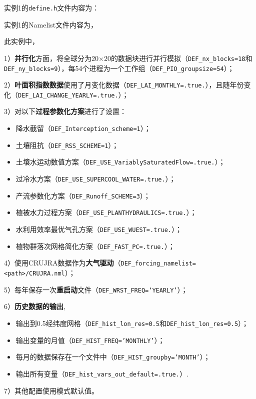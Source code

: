 实例1的\texttt{define.h}文件内容为：


实例1的Namelist文件内容为，


此实例中，\par
1）\textbf{并行化}方面，将全球分为20\textdegree$\times$20\textdegree 的数据块进行并行模拟（\texttt{DEF\_nx\_blocks=18}和\texttt{DEF\_ny\_blocks=9}），每54个进程为一个工作组（\texttt{DEF\_PIO\_groupsize=54}）；\par
2）\textbf{叶面积指数数据}使用了月变化数据（\texttt{DEF\_LAI\_MONTHLY=.true.}），且随年份变化（\texttt{DEF\_LAI\_CHANGE\_YEARLY=.true.}）；\par

3）对以下\textbf{过程参数化方案}进行了设置：
\begin{itemize}[nosep,leftmargin=4em]
    \item 降水截留（\texttt{DEF\_Interception\_scheme=1}）；
    \item 土壤阻抗（\texttt{DEF\_RSS\_SCHEME=1}）；
    \item 土壤水运动数值方案（\texttt{DEF\_USE\_VariablySaturatedFlow=.true.}）；
    \item 过冷水方案（\texttt{DEF\_USE\_SUPERCOOL\_WATER=.true.}）；
    \item 产流参数化方案（\texttt{DEF\_Runoff\_SCHEME=3}）；
    \item 植被水力过程方案（\texttt{DEF\_USE\_PLANTHYDRAULICS=.true.}）；
    \item 水利用效率最优气孔方案（\texttt{DEF\_USE\_WUEST=.true.}）；
    \item 植物群落次网格简化方案（\texttt{DEF\_FAST\_PC=.true.}）；

\end{itemize}
\par
4）使用CRUJRA数据作为\textbf{大气驱动}（\texttt{DEF\_forcing\_namelist=<path>/CRUJRA.nml}）；\par
5）每年保存一次\textbf{重启动}文件（\texttt{DEF\_WRST\_FREQ=‘YEARLY’}）；\par
6）\textbf{历史数据的输出},
\begin{itemize}[nosep,leftmargin=4em]
    \item 输出到0.5\textdegree 经纬度网格（\texttt{DEF\_hist\_lon\_res=0.5}和\texttt{DEF\_hist\_lon\_res=0.5}）；
    \item 输出变量的月值（\texttt{DEF\_HIST\_FREQ='MONTHLY'}）；
    \item 每月的数据保存在一个文件中（\texttt{DEF\_HIST\_groupby='MONTH'}）；
    \item 输出所有变量（\texttt{DEF\_hist\_vars\_out\_default=.true.}）.
\end{itemize}\par
7）其他配置使用模式默认值。

